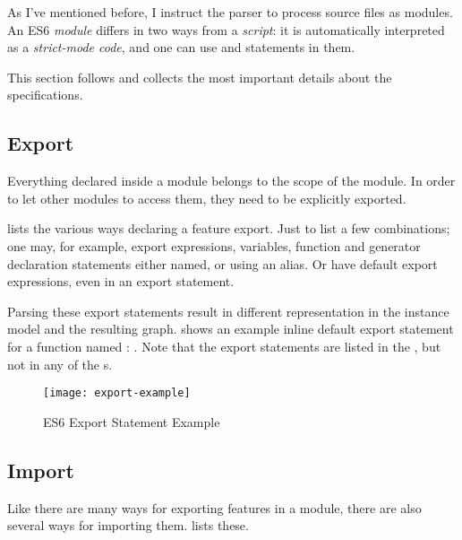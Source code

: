 As I've mentioned before, I instruct the parser to process source files as modules. An ES6 \emph{module} differs in two ways from a \emph{script}: it is automatically interpreted as a \emph{strict-mode code}, and one can use  and  statements in them.

This section follows
and collects the most important details about the specifications.


\subsection{Export}
Everything declared inside a module belongs to the scope of the module. In order to let other modules to access them, they need to be explicitly exported.

 lists the various ways declaring a feature export. Just to list a few combinations; one may, for example, export expressions, variables, function and generator declaration statements either named, or using an alias. Or have default export expressions, even in an export statement.

\begin{figure}[htbp]
	\begin{minipage}{\textwidth}
		
	\end{minipage}
\end{figure}

Parsing these export statements result in different representation in the instance model and the resulting graph.  shows an example inline default export statement for a function named : . Note that the export statements are listed in the , but not in any of the s.

\begin{figure}[htbp]
  \centering
  \texttt{[image: export-example]}
  \caption{ES6 Export Statement Example}
  \label{fig:es6-export-example}
\end{figure}


\subsection{Import}
Like there are many ways for exporting features in a module, there are also several ways for importing them.  lists these.

